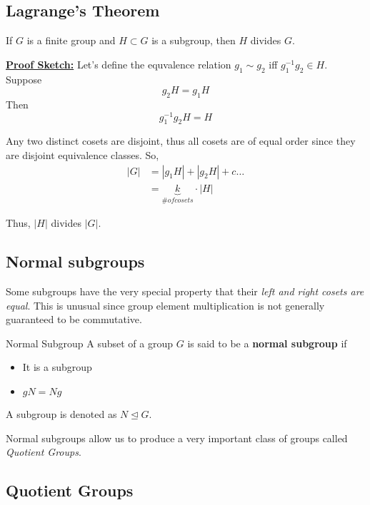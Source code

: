 \documentclass[11pt]{article}
\begin{document}
\vskip 1cm
\subsection{Lagrange's Theorem}

\vskip 0.5cm
\begin{dottedbox}
  \begin{theorem}
    If $G$ is a finite group and $H \subset G$ is a subgroup, then $H$ divides $G$.
  \end{theorem}
  
  \vskip 0.5cm
  \underline{\textbf{Proof Sketch:}} Let's define the equvalence relation $g_1 \sim g_2$ iff $g_1^{-1} g_2 \in H$. Suppose 
  \[ g_2 H = g_1 H \]
  Then 
  \[ g_1^{-1}g_2 H = H \]
  
  Any two distinct cosets are disjoint, thus all cosets are of equal order since they are disjoint equivalence classes. So, 
  \begin{align}
    \lvert G \rvert &= |g_1 H| + |g_2 H| + c\dots \\
    &= \underbrace{k}_{\# of cosets} \cdot \lvert H \rvert
  \end{align}

  Thus, $\lvert H \rvert$ divides $\lvert G \rvert$.
\end{dottedbox}

\vskip 1cm
\subsection{Normal subgroups}

\vskip 0.5cm
Some subgroups have the very special property that their \emph{left and right cosets are equal}. This is unusual since group element multiplication is not generally guaranteed to be commutative.

\begin{mathdefinitionbox}{Normal Subgroup}
\vskip 0.5cm
  A subset of a group $G$ is said to be a \textbf{normal subgroup} if 
  \begin{itemize}
    \item It is a subgroup
    \item $gN = Ng$ 
  \end{itemize}
  A subgroup is denoted as $N \trianglelefteq G$.
\end{mathdefinitionbox}

\vskip 0.5cm
Normal subgroups allow us to produce a very important class of groups called \emph{Quotient Groups}.

\vskip 1cm
\subsection{Quotient Groups}
\end{document}
